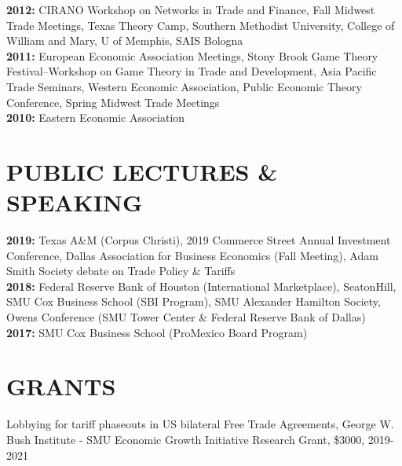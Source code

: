 \documentclass[11pt]{res}
\begin{document}
\begin{resume}
{\bf 2012:}  CIRANO Workshop on Networks in Trade and Finance, Fall Midwest Trade Meetings, Texas Theory Camp, Southern Methodist University, College of William and Mary, U of Memphis, SAIS Bologna\vspace{1.5mm}\\
{\bf 2011:} European Economic Association Meetings, Stony Brook Game Theory Festival--Workshop on Game Theory in Trade and Development, Asia Pacific Trade Seminars, Western Economic Association, Public Economic Theory Conference, Spring Midwest Trade Meetings\vspace{1.5mm}\\
{\bf 2010:} Eastern Economic Association

\section{PUBLIC LECTURES \& SPEAKING}\vspace{1.5mm}
{\bf 2019:} Texas A\&M (Corpus Christi), 2019 Commerce Street Annual Investment Conference, Dallas Association for Business Economics (Fall Meeting), Adam Smith Society debate on Trade Policy \& Tariffs\vspace{1.5mm}\\
{\bf 2018:} Federal Reserve Bank of Houston (International Marketplace), SeatonHill, SMU Cox Business School (SBI Program), SMU Alexander Hamilton Society, Owens Conference (SMU Tower Center \& Federal Reserve Bank of Dallas)\vspace{1.5mm}\\
{\bf 2017:} SMU Cox Business School (ProMexico Board Program)

\section{GRANTS}\vspace{1.5mm}
Lobbying for tariff phaseouts in US bilateral Free Trade Agreements, George W. Bush Institute - SMU Economic Growth Initiative Research Grant, \$3000, 2019-2021


\end{resume}
\end{document}
